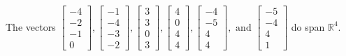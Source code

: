 \begin{exercise}
\begin{exerciseStatement}
  \end{exerciseStatement}
  \begin{exerciseAnswer}
   The vectors \(\left[\begin{array}{r}
-4 \\
-2 \\
-1 \\
0
\end{array}\right] , \left[\begin{array}{r}
-1 \\
-4 \\
-3 \\
-2
\end{array}\right] , \left[\begin{array}{r}
3 \\
3 \\
0 \\
3
\end{array}\right] , \left[\begin{array}{r}
4 \\
0 \\
4 \\
4
\end{array}\right] , \left[\begin{array}{r}
-4 \\
-5 \\
4 \\
4
\end{array}\right] , \text{ and } \left[\begin{array}{r}
-5 \\
-4 \\
4 \\
1
\end{array}\right]\) 
  	 do  
	span \(\mathbb{R}^4\).
  


  \end{exerciseAnswer}
\end{exercise}